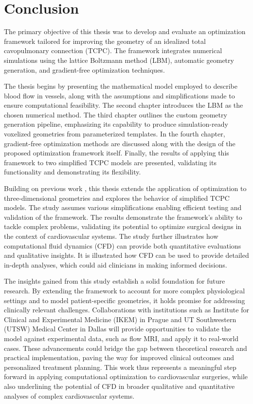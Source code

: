 \chapter*{Conclusion}

\pagestyle{plain}


The primary objective of this thesis was to develop and evaluate an optimization framework tailored for improving the geometry of an idealized total cavopulmonary connection (TCPC). The framework integrates numerical simulations using the lattice Boltzmann method (LBM), automatic geometry generation, and gradient-free optimization techniques.

The thesis begins by presenting the mathematical model employed to describe blood flow in vessels, along with the assumptions and simplifications made to ensure computational feasibility. The second chapter introduces the LBM as the chosen numerical method. The third chapter outlines the custom geometry generation pipeline, emphasizing its capability to produce simulation-ready voxelized geometries from parameterized templates. In the fourth chapter, gradient-free optimization methods are discussed along with the design of the proposed optimization framework itself. Finally, the results of applying this framework to two simplified TCPC models are presented, validating its functionality and demonstrating its flexibility.

Building on previous work \cite{buresBP, buresVU}, this thesis extends the application of optimization to three-dimensional geometries and explores the behavior of simplified TCPC models. The study assumes various simplifications enabling efficient testing and validation of the framework. The results demonstrate the framework's ability to tackle complex problems, validating its potential to optimize surgical designs in the context of cardiovascular systems. The study further illustrates how computational fluid dynamics (CFD) can provide both quantitative evaluations and qualitative insights. It is illustrated how CFD can be used to provide detailed in-depth analyses, which could aid clinicians in making informed decisions. 

The insights gained from this study establish a solid foundation for future research. By extending the framework to account for more complex physiological settings and to model patient-specific geometries, it holds promise for addressing clinically relevant challenges. Collaborations with institutions such as Institute for Clinical and Experimental Medicine (IKEM) in Prague and UT Southwestern (UTSW) Medical Center in Dallas will provide opportunities to validate the model against experimental data, such as flow MRI, and apply it to real-world cases. These advancements could bridge the gap between theoretical research and practical implementation, paving the way for improved clinical outcomes and personalized treatment planning. This work thus represents a meaningful step forward in applying computational optimization to cardiovascular surgeries, while also underlining the potential of CFD in broader qualitative and quantitative analyses of complex cardiovascular systems.